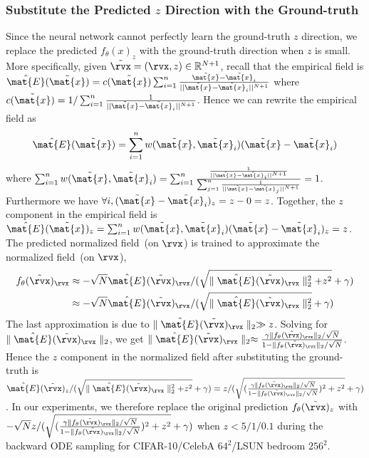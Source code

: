 \subsubsection{Substitute the Predicted $z$ Direction with the Ground-truth}
\label{app:sub}
Since the neural network cannot perfectly learn the ground-truth $z$ direction, we replace the predicted $f_\theta(x)_z$ with the ground-truth direction when $z$ is small. More specifically, given $\tilde{\rvx} = (\rvx, z) \in \mathbb{R}^{N+1}$, recall that the empirical field is $    \hat{\mat{E}}(\tilde{\mat{x}}) = c(\tilde{\mat{x}})\sum_{i=1}^n \frac{\tilde{\mat{x}}-\tilde{\mat{x}}_i}{||\tilde{\mat{x}}-\tilde{\mat{x}}_i||^{N+1}}$ where $c(\tilde{\mat{x}})=1/\sum_{i=1}^n \frac{1}{||\tilde{\mat{x}}-\tilde{\mat{x}}_i||^{N+1}} $. Hence we can rewrite the empirical field as 
\begin{align*}
    \hat{\mat{E}}(\tilde{\mat{x}}) =\sum_{i=1}^n w(\tilde{\mat{x}},\tilde{\mat{x}}_i) ({\tilde{\mat{x}}-\tilde{\mat{x}}_i})
\end{align*}
where $\sum_{i=1}^n w(\tilde{\mat{x}},\tilde{\mat{x}}_i) = \sum_{i=1}^n \frac{\frac{1}{||\tilde{\mat{x}}-\tilde{\mat{x}}_i||^{N+1}}}{\sum_{j=1}^n\frac{1}{||\tilde{\mat{x}}-\tilde{\mat{x}}_j||^{N+1}}}=1$. Furthermore we have $\forall i, ({\tilde{\mat{x}}-\tilde{\mat{x}}_i})_z = z - 0 = z$. Together, the $z$ component in the empirical field is $\hat{\mat{E}}(\tilde{\mat{x}})_z =\sum_{i=1}^n w(\tilde{\mat{x}},\tilde{\mat{x}}_i) ({\tilde{\mat{x}}-\tilde{\mat{x}}_i})_z = z$.
The predicted normalized field~(on $\rvx$) is trained to approximate the normalized field~(on $\rvx$), \ie 
\begin{align*}
f_\theta(\tilde{\rvx})_\rvx &\approx -\sqrt{N}\hat{\mat{E}}(\tilde{\rvx})_\rvx/(\sqrt{\parallel \hat{\mat{E}}(\tilde{\rvx})_\rvx \parallel_2^2+ z^2}+\gamma)\\&\approx -\sqrt{N}\hat{\mat{E}}(\tilde{\rvx})_\rvx/(\sqrt{\parallel \hat{\mat{E}}(\tilde{\rvx})_\rvx \parallel_2^2}+\gamma)    
\end{align*}
The last approximation is due to $\parallel \hat{\mat{E}}(\tilde{\rvx})_\rvx \parallel_2 \gg z$. Solving for $\parallel \hat{\mat{E}}(\tilde{\rvx})_\rvx\parallel_2$, we get $
    \parallel \hat{\mat{E}}(\tilde{\rvx})_\rvx\parallel_2 \approx \frac{\gamma \parallel f_\theta(\tilde{\rvx})_\rvx \parallel_2/\sqrt{N}}{1 - \parallel f_\theta(\tilde{\rvx})_\rvx \parallel_2/\sqrt{N}}
$. Hence the $z$ component in the normalized field after substituting the ground-truth is $\hat{\mat{E}}(\tilde{\rvx})_z/(\sqrt{\parallel \hat{\mat{E}}(\tilde{\rvx})_\rvx\parallel_2^2+z^2}+\gamma)=z/(\sqrt{(\frac{\gamma \parallel f_\theta(\tilde{\rvx})_\rvx \parallel_2/\sqrt{N}}{1 - \parallel f_\theta(\tilde{\rvx})_\rvx \parallel_2/\sqrt{N}})^2+z^2} + \gamma)$. In our experiments, we therefore replace the original prediction $f_\theta(\tilde{\rvx})_z$ with $-\sqrt{N}z/(\sqrt{(\frac{\gamma \parallel f_\theta(\tilde{\rvx})_\rvx \parallel_2/\sqrt{N}}{1 - \parallel f_\theta(\tilde{\rvx})_\rvx \parallel_2/\sqrt{N}})^2+z^2} + \gamma)$ when $z< 5/1/0.1$ during the backward ODE sampling for CIFAR-10/CelebA $64^2$/LSUN bedroom $256^2$. 

